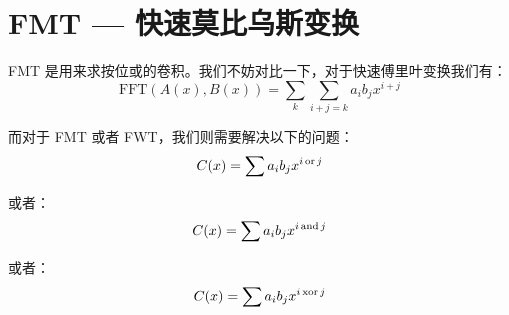 \section{FMT --- 快速莫比乌斯变换}
FMT 是用来求按位或的卷积。我们不妨对比一下，对于快速傅里叶变换我们有：
$$
\mathrm{FFT}(A(x), B(x)) = \sum_{k} \sum_{i + j = k} a_i b_j x^{i + j}
$$

而对于 FMT 或者 FWT，我们则需要解决以下的问题：
$$
C(x) = \sum a_i b_j x^{i \mathrm{\,or\,} j}
$$

或者：
$$
C(x) = \sum a_i b_j x^{i \mathrm{\,and\,} j}
$$

或者：
$$
C(x) = \sum a_i b_j x^{i \mathrm{\,xor\,} j}
$$


